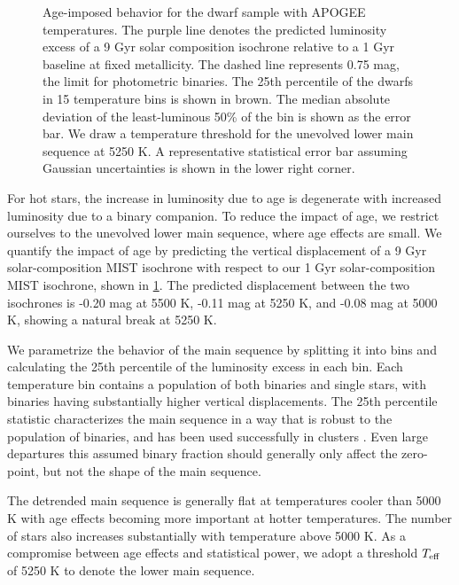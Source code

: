 \documentclass[manuscript]{aastex6}
\newcommand{\Teff}{\ensuremath{T_{\rm eff}}}
\begin{document}
\begin{figure}[htb]
    \centering
    \caption{Age-imposed behavior for the dwarf sample with APOGEE
        temperatures. The purple line denotes the predicted luminosity excess of 
        a 9 Gyr solar composition isochrone relative to a 1 Gyr baseline at
        fixed metallicity. The dashed line represents 0.75 
        mag, the limit for photometric binaries. The 25th percentile of the 
        dwarfs in 15 temperature bins is shown in brown. The median absolute 
        deviation of the least-luminous 50\% of the bin is shown as the error 
        bar. We draw a temperature threshold for the unevolved lower main 
        sequence at 5250 K. A representative statistical error bar assuming 
        Gaussian uncertainties is shown in the lower right corner.}
    \label{fig:ages}
\end{figure}

For hot stars, the increase in luminosity due to age is degenerate with
increased luminosity due to a binary companion. To reduce the impact of age,
we restrict ourselves to the unevolved lower main sequence, where age
effects are small. We quantify the impact of age by predicting the vertical
displacement of a 9 Gyr solar-composition MIST isochrone with respect to our 
1 Gyr solar-composition MIST isochrone, shown in \cref{fig:ages}. The
predicted displacement between the two isochrones is -0.20 mag at 5500 K, 
-0.11 mag at 5250 K, and -0.08 mag at 5000 K, showing a natural break at 5250
K.

We parametrize the behavior of the main sequence by splitting it into bins
and calculating the 25th percentile of the luminosity excess in each bin. Each 
temperature bin contains a population of both binaries and single stars, with 
binaries having substantially higher vertical displacements. The 25th 
percentile statistic characterizes the main sequence in a way that is robust 
to the population of binaries, and has been used successfully in clusters 
\citep{An06}. Even large departures this assumed binary fraction should 
generally only affect the zero-point, but not the shape of the main sequence.

The detrended main sequence is generally flat at temperatures cooler than 5000 K 
with age effects becoming more important at hotter temperatures. The number of stars
also increases substantially with temperature above 5000 K. As a compromise
between age effects and statistical power, we adopt a threshold \Teff{} of 
5250 K to denote the lower main sequence.
\end{document}
